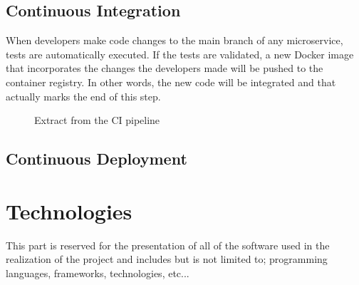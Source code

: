 \subsection{Continuous Integration}
When developers make code changes to the main branch of any microservice, tests are automatically executed.
If the tests are validated, a new Docker image that incorporates the changes the developers made will be pushed to the container registry.
In other words, the new code will be integrated and that actually marks the end of this step.
\begin{figure}[H]
    \centering
    \caption{Extract from the CI pipeline}
    \label{fig:extract-from-ci-pipeline}
\end{figure}

\subsection{Continuous Deployment}


\newpage
\section{Technologies}
This part is reserved for the presentation of all of the software used in the realization of the project and includes but is not limited to; programming languages, frameworks, technologies, etc...

